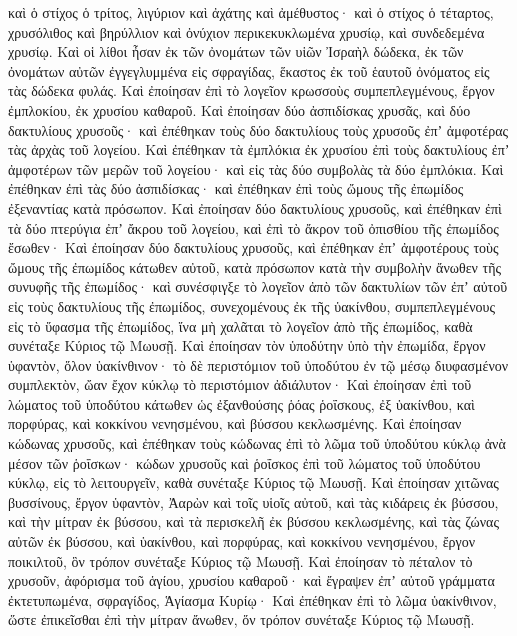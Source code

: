 {καὶ ὁ στίχος ὁ τρίτος, λιγύριον καὶ ἀχάτης καὶ ἀμέθυστος·
καὶ ὁ στίχος ὁ τέταρτος, χρυσόλιθος καὶ βηρύλλιον καὶ ὀνύχιον περικεκυκλωμένα χρυσίῳ, καὶ συνδεδεμένα χρυσίῳ.
Καὶ οἱ λίθοι ἦσαν ἐκ τῶν ὀνομάτων τῶν υἱῶν Ἰσραὴλ δώδεκα, ἐκ τῶν ὀνομάτων αὐτῶν ἐγγεγλυμμένα εἰς σφραγίδας, ἕκαστος ἐκ τοῦ ἑαυτοῦ ὀνόματος εἰς τὰς δώδεκα φυλάς.
Καὶ ἐποίησαν ἐπὶ τὸ λογεῖον κρωσσοὺς συμπεπλεγμένους, ἔργον ἐμπλοκίου, ἐκ χρυσίου καθαροῦ.
Καὶ ἐποίησαν δύο ἀσπιδίσκας χρυσᾶς, καὶ δύο δακτυλίους χρυσοῦς· καὶ ἐπέθηκαν τοὺς δύο δακτυλίους τοὺς χρυσοῦς ἐπʼ ἀμφοτέρας τὰς ἀρχὰς τοῦ λογείου.
Καὶ ἐπέθηκαν τὰ ἐμπλόκια ἐκ χρυσίου ἐπὶ τοὺς δακτυλίους ἐπʼ ἀμφοτέρων τῶν μερῶν τοῦ λογείου·
καὶ εἰς τὰς δύο συμβολὰς τὰ δύο ἐμπλόκια. Καὶ ἐπέθηκαν ἐπὶ τὰς δύο ἀσπιδίσκας· καὶ ἐπέθηκαν ἐπὶ τοὺς ὤμους τῆς ἐπωμίδος ἐξεναντίας κατὰ πρόσωπον.
Καὶ ἐποίησαν δύο δακτυλίους χρυσοῦς, καὶ ἐπέθηκαν ἐπὶ τὰ δύο πτερύγια ἐπʼ ἄκρου τοῦ λογείου, καὶ ἐπὶ τὸ ἄκρον τοῦ ὀπισθίου τῆς ἐπωμίδος ἔσωθεν·
Καὶ ἐποίησαν δύο δακτυλίους χρυσοῦς, καὶ ἐπέθηκαν ἐπʼ ἀμφοτέρους τοὺς ὤμους τῆς ἐπωμίδος κάτωθεν αὐτοῦ, κατὰ πρόσωπον κατὰ τὴν συμβολὴν ἄνωθεν τῆς συνυφῆς τῆς ἐπωμίδος·
καὶ συνέσφιγξε τὸ λογεῖον ἀπὸ τῶν δακτυλίων τῶν ἐπʼ αὐτοῦ εἰς τοὺς δακτυλίους τῆς ἐπωμίδος, συνεχομένους ἐκ τῆς ὑακίνθου, συμπεπλεγμένους εἰς τὸ ὕφασμα τῆς ἐπωμίδος, ἵνα μὴ χαλᾶται τὸ λογεῖον ἀπὸ τῆς ἐπωμίδος, καθὰ συνέταξε Κύριος τῷ Μωυσῇ.
Καὶ ἐποίησαν τὸν ὑποδύτην ὑπὸ τὴν ἐπωμίδα, ἔργον ὑφαντὸν, ὅλον ὑακίνθινον·
τὸ δὲ περιστόμιον τοῦ ὑποδύτου ἐν τῷ μέσῳ διυφασμένον συμπλεκτὸν, ὤαν ἔχον κύκλῳ τὸ περιστόμιον ἀδιάλυτον·
Καὶ ἐποίησαν ἐπὶ τοῦ λώματος τοῦ ὑποδύτου κάτωθεν ὡς ἐξανθούσης ῥόας ῥοΐσκους, ἐξ ὑακίνθου, καὶ πορφύρας, καὶ κοκκίνου νενησμένου, καὶ βύσσου κεκλωσμένης.
Καὶ ἐποίησαν κώδωνας χρυσοῦς, καὶ ἐπέθηκαν τοὺς κώδωνας ἐπὶ τὸ λῶμα τοῦ ὑποδύτου κύκλῳ ἀνὰ μέσον τῶν ῥοΐσκων·
κώδων χρυσοῦς καὶ ῥοΐσκος ἐπὶ τοῦ λώματος τοῦ ὑποδύτου κύκλῳ, εἰς τὸ λειτουργεῖν, καθὰ συνέταξε Κύριος τῷ Μωυσῇ.
Καὶ ἐποίησαν χιτῶνας βυσσίνους, ἔργον ὑφαντὸν, Ἀαρὼν καὶ τοῖς υἱοῖς αὐτοῦ,
καὶ τὰς κιδάρεις ἐκ βύσσου, καὶ τὴν μίτραν ἐκ βύσσου, καὶ τὰ περισκελῆ ἐκ βύσσου κεκλωσμένης,
καὶ τὰς ζώνας αὐτῶν ἐκ βύσσου, καὶ ὑακίνθου, καὶ πορφύρας, καὶ κοκκίνου νενησμένου, ἔργον ποικιλτοῦ, ὃν τρόπον συνέταξε Κύριος τῷ Μωυσῇ.
Καὶ ἐποίησαν τὸ πέταλον τὸ χρυσοῦν, ἀφόρισμα τοῦ ἁγίου, χρυσίου καθαροῦ· καὶ ἔγραψεν ἐπʼ αὐτοῦ γράμματα ἐκτετυπωμένα, σφραγίδος, Ἁγίασμα Κυρίῳ·
Καὶ ἐπέθηκαν ἐπὶ τὸ λῶμα ὑακίνθινον, ὥστε ἐπικεῖσθαι ἐπὶ τὴν μίτραν ἄνωθεν, ὅν τρόπον συνέταξε Κύριος τῷ Μωυσῇ.

}
